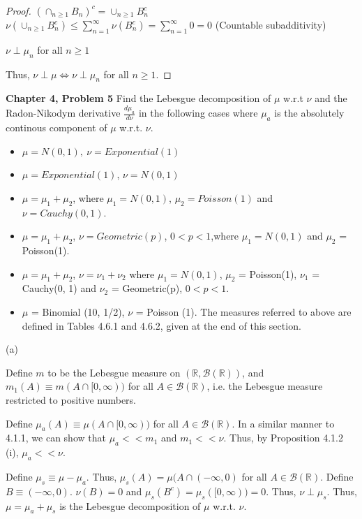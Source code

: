 \documentclass[12pt,letterpaper, onecolumn]{exam}
\newcommand{\real}{\mathbb{R}}
\newcommand{\borel}{\mathcal{B}(\mathbb{R})}
\newcommand{\cutesum}[1]{\sum_{#1 = 1}^\infty}
\begin{document}
\begin{questions}
\begin{solution}
\begin{proof}
                $(\cap_{n\geq 1} B_n)^c = \cup_{n\geq1}B_n^c$ \\
                $\nu( \cup_{n\geq1}B_n^c) \leq \cutesum{n}\nu(B_n^c) = \cutesum{n} 0 = 0$ (Countable subadditivity)

                $\nu \perp \mu_n$ for all $n \geq 1$

                Thus, $\nu \perp \mu \iff \nu \perp \mu_n$ for all $n \geq 1.$
            \end{proof}
    \end{solution}

    \question \textbf{Chapter 4, Problem 5}
    Find the Lebesgue decomposition of $\mu$ w.r.t $\nu$ and the Radon-Nikodym derivative $\frac{d \mu_a}{d\nu}$ in the following cases where $\mu_a$ is the absolutely continous component of $\mu$ w.r.t. $\nu$.
    \begin{itemize}
        \item[(a)] $\mu = N(0, 1), \: \nu = Exponential(1)$
        \item[(b)] $\mu = Exponential(1)$, $\nu = N(0,1)$
        \item[(c)] $\mu = \mu_1 + \mu_2$, where $\mu_1 = N(0,1)$, $\mu_2 = Poisson(1)$ and $\nu = Cauchy(0, 1)$.
        \item[(d)] $\mu=\mu_1+\mu_2$, $\nu=Geometric(p)$, $0<p<1$,where $\mu_1 =N(0,1)$ and $\mu_2$ = Poisson(1).
        \item[(e)] $\mu=\mu_1+\mu_2$, $\nu=\nu_1+\nu_2$ where $\mu_1 =N(0,1)$, $\mu_2$ = Poisson(1), $\nu_1$ = Cauchy(0, 1) and $\nu_2$ = Geometric(p), $0 < p < 1.$
        \item[(f)] $\mu$ = Binomial (10, 1/2), $\nu$ = Poisson (1). The measures referred to above are defined in Tables 4.6.1 and 4.6.2, given at the end of this section. 
    \end{itemize}
    \begin{solution}
        (a)
        
        Define $m$ to be the Lebesgue measure on $(\real, \borel)$, and $m_1(A) \equiv m(A \cap [0, \infty))$ for all $A \in \borel$, i.e. the Lebesgue measure restricted to positive numbers. 

        Define $\mu_a(A) \equiv \mu(A \cap [0, \infty))$ for all $A \in \borel$. In a similar manner to 4.1.1, we can show that $\mu_a << m_1$ and $m_1 << \nu$. Thus, by Proposition 4.1.2 (i), $\mu_a << \nu$. 

        Define $\mu_s \equiv \mu - \mu_a$. Thus, $\mu_s(A) = \mu(A \cap (-\infty, 0)$ for all $A \in \borel$. Define $B \equiv (-\infty, 0)$. $\nu(B) = 0$ and $\mu_s(B^c) = \mu_s([0, \infty))= 0$. Thus, $\nu \perp \mu_s$. Thus, $\mu = \mu_a + \mu_s$ is the Lebesgue decomposition of $\mu$ w.r.t. $\nu$.


\end{solution}
\end{questions}
\end{document}

